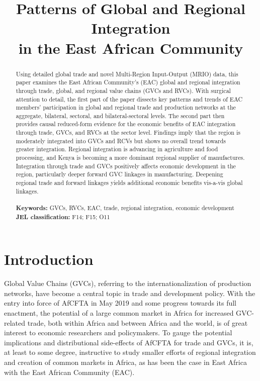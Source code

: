 \documentclass[a4paper]{article}
\title{\textbf{Patterns of Global and Regional Integration\\ in the East African Community}}
\date{}
\begin{document}
\maketitle


\begin{abstract}
Using detailed global trade and novel Multi-Region Input-Output (MRIO) data, this paper examines the East African Community's (EAC) global and regional integration through trade, global, and regional value chains (GVCs and RVCs). With surgical attention to detail, the first part of the paper dissects key patterns and trends of EAC members' participation in global and regional trade and production networks at the aggregate, bilateral, sectoral, and bilateral-sectoral levels. The second part then provides causal reduced-form evidence for the economic benefits of EAC integration through trade, GVCs, and RVCs at the sector level. Findings imply that the region is moderately integrated into GVCs and RCVs but shows no overall trend towards greater integration. Regional integration is advancing in agriculture and food processing, and Kenya is becoming a more dominant regional supplier of manufactures. Integration through trade and GVCs positively affects economic development in the region, particularly deeper forward GVC linkages in manufacturing. Deepening regional trade and forward linkages yields additional economic benefits vis-a-vis global linkages. \\\\
\noindent \textbf{Keywords:} GVCs, RVCs, EAC, trade, regional integration, economic development\\
\textbf{JEL classification:} F14; F15; O11
\end{abstract}



\section{Introduction}

Global Value Chains (GVCs), referring to the internationalization of production networks, have become a central topic in trade and development policy. With the entry into force of AfCFTA in May 2019 and some progress towards its full enactment, the potential of a large common market in Africa for increased GVC-related trade, both within Africa and between Africa and the world, is of great interest to economic researchers and policymakers. To gauge the potential implications and distributional side-effects of AfCFTA for trade and GVCs, it is, at least to some degree, instructive to study smaller efforts of regional integration and creation of common markets in Africa, as has been the case in East Africa with the East African Community (EAC). \newline 
\end{document}
